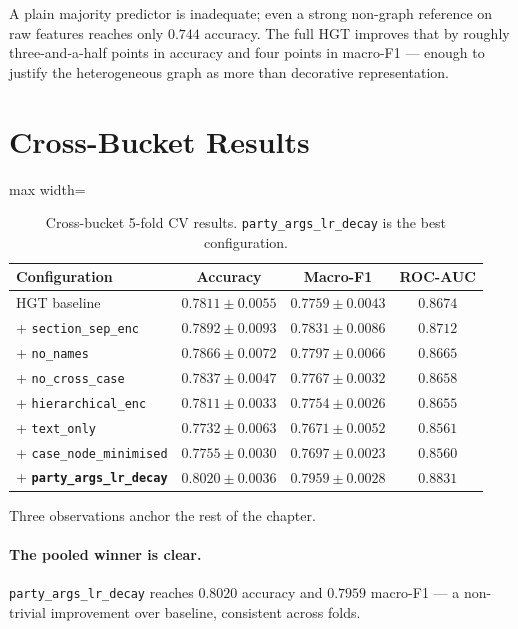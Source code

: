 A plain majority predictor is inadequate; even a strong non-graph reference on raw features reaches only $0.744$ accuracy. The full HGT improves that by roughly three-and-a-half points in accuracy and four points in macro-F1 --- enough to justify the heterogeneous graph as more than decorative representation.

\section{Cross-Bucket Results}
\label{sec:main_results}

\begin{table}[H]
  \centering
  \small
  \begin{adjustbox}{max width=\textwidth}
  \begin{tabular}{lccc}
    \toprule
    Configuration & Accuracy & Macro-F1 & ROC-AUC \\
    \midrule
    HGT baseline                      & $0.7811\pm0.0055$ & $0.7759\pm0.0043$ & $0.8674$ \\
    + \texttt{section\_sep\_enc}      & $0.7892\pm0.0093$ & $0.7831\pm0.0086$ & $0.8712$ \\
    + \texttt{no\_names}              & $0.7866\pm0.0072$ & $0.7797\pm0.0066$ & $0.8665$ \\
    + \texttt{no\_cross\_case}        & $0.7837\pm0.0047$ & $0.7767\pm0.0032$ & $0.8658$ \\
    + \texttt{hierarchical\_enc}      & $0.7811\pm0.0033$ & $0.7754\pm0.0026$ & $0.8655$ \\
    + \texttt{text\_only}             & $0.7732\pm0.0063$ & $0.7671\pm0.0052$ & $0.8561$ \\
    + \texttt{case\_node\_minimised}  & $0.7755\pm0.0030$ & $0.7697\pm0.0023$ & $0.8560$ \\
    \midrule
    + \textbf{\texttt{party\_args\_lr\_decay}} & $\mathbf{0.8020\pm0.0036}$ &
      $\mathbf{0.7959\pm0.0028}$ & $\mathbf{0.8831}$ \\
    \bottomrule
  \end{tabular}
  \end{adjustbox}
  \caption{Cross-bucket 5-fold CV results. \texttt{party\_args\_lr\_decay} is the best configuration.}
  \label{tab:cross_bucket_results}
\end{table}

Three observations anchor the rest of the chapter.

\paragraph{The pooled winner is clear.} \texttt{party\_args\_lr\_decay} reaches $0.8020$ accuracy and $0.7959$ macro-F1 --- a non-trivial improvement over baseline, consistent across folds.

